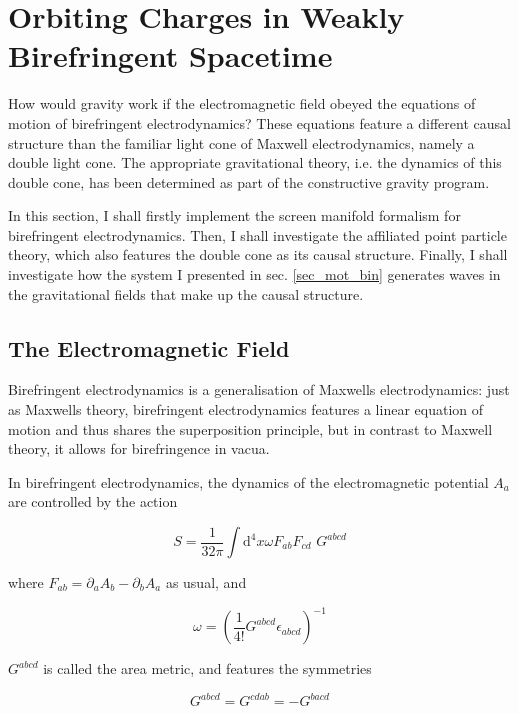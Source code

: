 \documentclass[11pt]{article}
\begin{document}
\section{Orbiting Charges in Weakly Birefringent Spacetime}

How would gravity work if the electromagnetic field obeyed the equations of motion of birefringent electrodynamics? These equations feature a different causal structure than the familiar light cone of Maxwell electrodynamics, namely a double light cone. The appropriate gravitational theory, i.e. the  dynamics of this double cone, has been determined as part of the constructive gravity program.

In this section, I shall firstly implement the screen manifold formalism for birefringent electrodynamics. Then, I shall investigate the affiliated point particle theory, which also features the double cone as its causal structure. Finally, I shall investigate how the system I presented in sec. \ref{sec_mot_bin} generates waves in the gravitational fields that make up the causal structure.

\subsection{The Electromagnetic Field} \label{sec_em_am}

Birefringent electrodynamics is a generalisation of Maxwells electrodynamics: just as Maxwells theory, birefringent electrodynamics features a linear equation of motion and thus shares the superposition principle, but in contrast to Maxwell theory, it allows for birefringence in vacua.

In birefringent electrodynamics, the dynamics of the electromagnetic potential $A_a$ are controlled by the action 

\begin{equation} \label{act_gled}
	S = \frac{1}{32 \pi} \int \mathrm{d}^4 x \omega F_{a b} F_{c d} \, \,
	G^{a b c d}
\end{equation}

where $F_{a b} = \partial_a A_b - \partial_b A_a $ as usual, and 

\begin{equation}
	\omega = \left( \frac{1}{4 !} G^{a b c d} \epsilon_{a b c d} \right)^{-1}
\end{equation}

 $G^{a b c d}$ is called the area metric, and features the symmetries

\begin{equation}
	G^{a b c d} = G^{c d a b} = - G^{b a c d}	
\end{equation}
\end{document}
